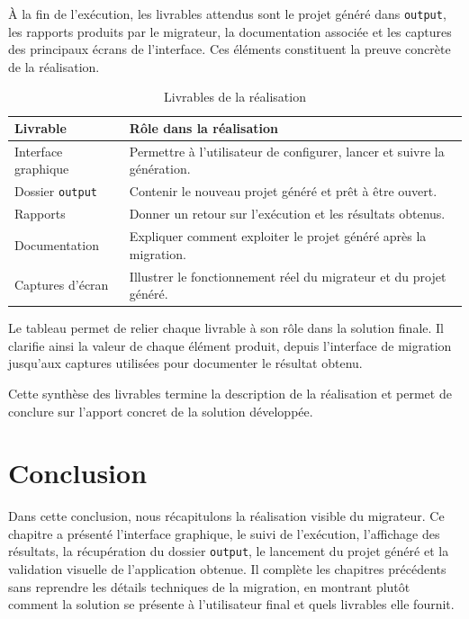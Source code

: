 À la fin de l'exécution, les livrables attendus sont le projet généré dans \texttt{output}, les rapports produits par le migrateur, la documentation associée et les captures des principaux écrans de l'interface. Ces éléments constituent la preuve concrète de la réalisation.

\begingroup
\renewcommand{\arraystretch}{1.18}
\begin{longtable}{|p{4.2cm}|p{9.6cm}|}
\caption{Livrables de la réalisation}\label{tab:livrables-realisation}\\
\hline
\textbf{Livrable} & \textbf{Rôle dans la réalisation} \\
\hline
Interface graphique & Permettre à l'utilisateur de configurer, lancer et suivre la génération. \\
\hline
Dossier \texttt{output} & Contenir le nouveau projet généré et prêt à être ouvert. \\
\hline
Rapports & Donner un retour sur l'exécution et les résultats obtenus. \\
\hline
Documentation & Expliquer comment exploiter le projet généré après la migration. \\
\hline
Captures d'écran & Illustrer le fonctionnement réel du migrateur et du projet généré. \\
\hline
\end{longtable}
\endgroup

Le tableau permet de relier chaque livrable à son rôle dans la solution finale. Il clarifie ainsi la valeur de chaque élément produit, depuis l'interface de migration jusqu'aux captures utilisées pour documenter le résultat obtenu.

Cette synthèse des livrables termine la description de la réalisation et permet de conclure sur l'apport concret de la solution développée.

\section*{Conclusion}

Dans cette conclusion, nous récapitulons la réalisation visible du migrateur. Ce chapitre a présenté l'interface graphique, le suivi de l'exécution, l'affichage des résultats, la récupération du dossier \texttt{output}, le lancement du projet généré et la validation visuelle de l'application obtenue. Il complète les chapitres précédents sans reprendre les détails techniques de la migration, en montrant plutôt comment la solution se présente à l'utilisateur final et quels livrables elle fournit.

